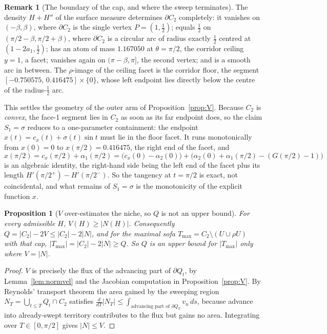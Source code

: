 \documentclass[11pt]{article}
\newtheorem{proposition}[theorem]{Proposition}
\theoremstyle{definition}
\newtheorem{remark}[theorem]{Remark}
\begin{document}
\begin{remark}[The boundary of the cap, and where the sweep terminates]\label{rem:cap}
The density $H+H''$ of the surface measure determines $\partial C_2$ completely:
it vanishes on $(-\beta,\beta)$, where $\partial C_2$ is the single vertex
$P=(1,\tfrac12)$; equals $\tfrac12$ on $(\pi/2-\beta,\pi/2+\beta)$, where $\partial C_2$
is a circular arc of radius exactly $\tfrac12$ centred at $(1-2a_1,\tfrac12)$; has an
atom of mass $1.167050$ at $\theta=\pi/2$, the corridor ceiling $y=1$, a facet; vanishes
again on $(\pi-\beta,\pi]$, the second vertex; and is a smooth arc in between. The
$\rho$-image of the ceiling facet is the corridor floor, the segment
$[-0.750575,\,0.416475]\times\{0\}$, whose left endpoint lies directly below the centre
of the radius-$\tfrac12$ arc.

This settles the geometry of the outer arm of Proposition~\ref{prop:V}. Because $C_2$ is
\emph{convex}, the face-1 segment lies in $C_2$ as soon as its far endpoint does, so the
claim $S_1=\sigma$ reduces to a one-parameter containment: the endpoint
$x(t)=c_x(t)+\sigma(t)\sin t$ must lie in the floor facet. It runs monotonically from
$x(0)=0$ to $x(\pi/2)=0.416475$, the right end of the facet, and
\[
  x(\pi/2)=c_x(\pi/2)+\alpha_1(\pi/2)
  =\bigl(c_x(0)-\alpha_2(0)\bigr)+\bigl(\alpha_2(0)+\alpha_1(\pi/2)-(G(\pi/2)-1)\bigr)
\]
is an algebraic identity, the right-hand side being the left end of the facet plus its
length $H'(\pi/2^+)-H'(\pi/2^-)$. So the tangency at $t=\pi/2$ is exact, not
coincidental, and what remains of $S_1=\sigma$ is the monotonicity of the explicit
function $x$.
\end{remark}

\begin{proposition}[$V$ over-estimates the niche, so $Q$ is not an upper bound]
\label{prop:reynolds}
For every admissible $H$, $V(H)\ge|N(H)|$. Consequently
$Q=|C_2|-2V\le|C_2|-2|N|$, and for the maximal sofa
$T_{\max}=C_2\setminus(U\cup\rho U)$ with that cap, $|T_{\max}|=|C_2|-2|N|\ge Q$. So $Q$
is an upper bound for $|T_{\max}|$ only where $V=|N|$.
\end{proposition}

\begin{proof}
$V$ is precisely the flux of the advancing part of $\partial Q_t$, by
Lemma~\ref{lem:normvel} and the Jacobian computation in Proposition~\ref{prop:V}. By
Reynolds' transport theorem the area gained by the sweeping region
$N_T=\bigcup_{t\le T}Q_t\cap C_2$ satisfies
$\tfrac{d}{dT}|N_T|\le\int_{\text{advancing part of }\partial Q_T}v_n\,ds$, because
advance into already-swept territory contributes to the flux but gains no area.
Integrating over $T\in[0,\pi/2]$ gives $|N|\le V$.
\end{proof}
\end{document}
